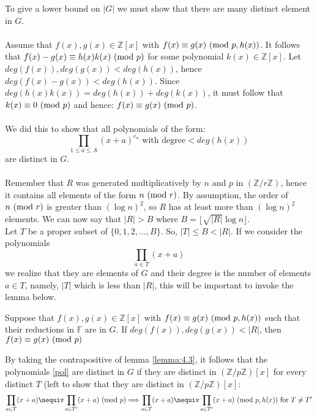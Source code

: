 To give a lower bound on $|G|$ we must show that there are many distinct element in $G$.\\\\
Assume that $f(x),g(x)\in \mathbb{Z}[x]$ with $f(x)\equiv g(x) \ (\mathrm{mod}\ p,h(x))$. It follows that $f(x)-g(x)\equiv h(x)k(x) \ (\mathrm{mod}\ p)$ for some polynomial $k(x)\in\mathbb{Z}[x]$. Let $deg(f(x)), deg(g(x))<deg(h(x))$, hence $deg(f(x)-g(x))<deg(h(x))$. Since $deg(h(x)k(x))=deg(h(x))+deg(k(x))$, it must follow that $k(x) \equiv 0\ (\mathrm{mod}\ p)$ and hence: $f(x)\equiv g(x) \ (\mathrm{mod}\ p)$.\\\\
We did this to show that all polynomials of the form:
\begin{equation*}
    \prod_{1\leq a\leq A}(x+a)^{e_a}\text{ with degree} < deg(h(x))
\end{equation*}
are distinct in $G$.\\\\
Remember that $R$ was generated multiplicatively by $n$ and $p$ in $(\mathbb{Z}/r\mathbb{Z})$, hence it contains all elements of the form $n \ (\mathrm{mod}\ r)$. By assumption, the order of $n\ (\mathrm{mod}\ r)$ is greater than $(\log n)^2$, so $R$ has at least more than $(\log n)^2$ elements. We can now say that $|R|>B$ where $B=\lfloor \sqrt{|R|}\log n\rfloor$.\\
Let $T$ be a proper subset of $\{0,1,2,...,B\}$. So, $|T|\leq B<|R|$. If we consider the polynomials
\begin{equation}
\label{pol}
    \prod_{a\in T}(x+a)
\end{equation}
we realize that they are elements of $G$ and their degree is the number of elements $a\in T$, namely, $|T|$ which is less than $|R|$, this will be important to invoke the lemma below.
\begin{lemma}
\label{lemma:4.3}
    Suppose that $f(x), g(x)\in\mathbb{Z}[x]$ with $f(x)\equiv g(x) \ (\mathrm{mod}\ p,h(x))$ such that their reductions in $\mathbb{F}$ are in $G$.
    If $deg(f(x)),deg(g(x))<|R|$, then $f(x)\equiv g(x) \ (\mathrm{mod}\ p)$
\end{lemma}
By taking the contrapositive of lemma \ref{lemma:4.3}, it follows that the polynomials \ref{pol} are distinct in $G$ if they are distinct in $(\mathbb{Z}/p\mathbb{Z})[x]$ for every distinct $T$ (left to show that they are distinct in $(\mathbb{Z}/p\mathbb{Z})[x]$:
\begin{equation*}
    \prod_{a\in T}(x+a) \nequiv\prod_{a\in T'}(x+a)\Mod p\Longrightarrow \prod_{a\in T}(x+a) \nequiv\prod_{a\in T'}(x+a)\Mod {p,h(x)}\text{  for $T\neq T'$}
\end{equation*}
